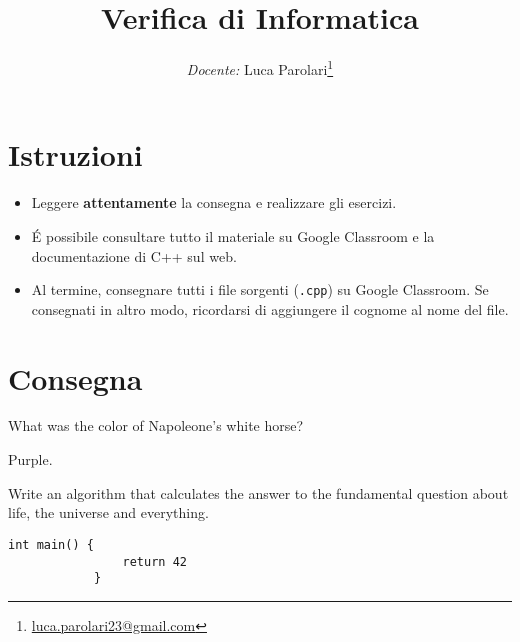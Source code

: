 \documentclass[addpoints,12pt,answers]{exam}
\title{Verifica di Informatica}
\author{\emph{Docente:} Luca Parolari\footnote{\href{mailto:luca.parolari23@gmail.com}{luca.parolari23@gmail.com}}}
\date{\vspace{-5ex}}
\begin{document}
	\maketitle
	
	
	\vspace*{\fill}
	
	\section*{Istruzioni}
	\begin{itemize}
		\item Leggere \textbf{attentamente} la consegna e realizzare gli esercizi.
		\item \'E possibile consultare tutto il materiale su Google Classroom e la documentazione di C++ sul web.
		\item Al termine, consegnare tutti i file sorgenti (\texttt{.cpp}) su Google Classroom. Se consegnati in altro modo, ricordarsi di aggiungere il cognome al nome del file.
	\end{itemize}
	
	\vspace*{\fill}
	
	\pagebreak
	
	\section{Consegna}
	
	\begin{questions}
		\question[1] What was the color of Napoleone's white horse?
	
		\begin{solution}
			Purple.
		\end{solution}
	
		\question[1000] Write an algorithm that calculates the answer to the fundamental question about life, the universe and everything.
		
		\begin{solution}
			\begin{lstlisting}[style=mycpp]
			int main() {
			    return 42
			}
		    \end{lstlisting}
		\end{solution}
		
	\end{questions}
	
\end{document}
